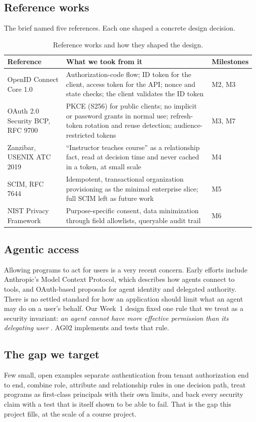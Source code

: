 \subsection{Reference works}
The brief named five references. Each one shaped a concrete design decision.

\begin{table}[H]
\centering
\begin{tabularx}{\textwidth}{@{}P{3.8cm} L P{2.1cm}@{}}
\toprule
\textbf{Reference} & \textbf{What we took from it} & \textbf{Milestones}\\
\midrule
OpenID Connect Core 1.0 \cite{oidc} & Authorization-code flow; ID token for the client, access token for the API; nonce and state checks; the client validates the ID token & M2, M3\\
OAuth 2.0 Security BCP, RFC 9700 \cite{bcp} & PKCE (S256) for public clients; no implicit or password grants in normal use; refresh-token rotation and reuse detection; audience-restricted tokens & M3, M7\\
Zanzibar, USENIX ATC 2019 \cite{zanzibar} & ``Instructor teaches course'' as a relationship fact, read at decision time and never cached in a token, at small scale & M4\\
SCIM, RFC 7644 \cite{scim} & Idempotent, transactional organization provisioning as the minimal enterprise slice; full SCIM left as future work & M5\\
NIST Privacy Framework \cite{nist} & Purpose-specific consent, data minimization through field allowlists, queryable audit trail & M6\\
\bottomrule
\end{tabularx}
\caption{Reference works and how they shaped the design.}
\end{table}

\subsection{Agentic access}
Allowing programs to act for users is a very recent concern. Early efforts include Anthropic's Model Context Protocol, which describes how agents connect to tools, and OAuth-based proposals for agent identity and delegated authority. There is no settled standard for how an application should limit what an agent may do on a user's behalf. Our Week~1 design fixed one rule that we treat as a security invariant: \emph{an agent cannot have more effective permission than its delegating user} \cite{week1}. AG02 implements and tests that rule.

\subsection{The gap we target}
Few small, open examples separate authentication from tenant authorization end to end, combine role, attribute and relationship rules in one decision path, treat programs as first-class principals with their own limits, and back every security claim with a test that is itself shown to be able to fail. That is the gap this project fills, at the scale of a course project.
